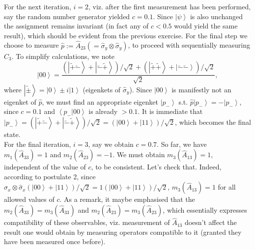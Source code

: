 \documentclass[british,aps,prl,superscriptaddress,nofootinbib,times,reprint]{revtex4-1}
\theoremstyle{plain}
\theoremstyle{definition}
\theoremstyle{remark}
\theoremstyle{remark}
\theoremstyle{remark}
\theoremstyle{plain}
\theoremstyle{plain}
\theoremstyle{plain}
\theoremstyle{definition}
\theoremstyle{definition}
\begin{document}
For the next iteration, $i=2$, viz.
after the first measurement has been performed,
say the random number generator yielded $c=0.1$.
Since $\left|\psi\right\rangle $ is also unchanged
the assignment remains invariant (in fact any of
$c<0.5$ would yield the same result), which should
be evident from the previous exercise. For the
final step we choose to measure
$\hat p := \hat{A}_{23}(=\hat{\sigma}_{y}\otimes\hat{\sigma}_{y})$,
to proceed with sequentially measuring
$\hat{C}_{3}$. To simplify calculations, we note
\[ \left|00\right\rangle
=\frac{(\left|\tilde{+}\tilde{-}\right\rangle
+\left|\tilde{-}\tilde{+}\right\rangle
)/\sqrt{2}+(\left|\tilde{+}\tilde{+}\right\rangle
+\left|\tilde{-}\tilde{-}\right\rangle
)/\sqrt{2}}{\sqrt{2}}, \] where
$\left|\tilde{\pm}\right\rangle
=\left|0\right\rangle \pm i\left|1\right\rangle $
(eigenkets of $\hat{\sigma}_{y}$). Since
$\left|00\right\rangle $ is manifestly not an
eigenket of $\hat{p}$, we must find an appropriate
eigenket $\left|p_{-}\right\rangle $ s.t.
$\hat{p}\left|p_{-}\right\rangle
=-\left|p_{-}\right\rangle $, since $c=0.1$ and
$\left\langle p_{-}|00\right\rangle $ is already
$>0.1$. It is immediate that
$\left|p_{-}\right\rangle
=\left(\left|\tilde{+}\tilde{-}\right\rangle
+\left|\tilde{-}\tilde{+}\right\rangle
\right)/\sqrt{2}=\left(\left|00\right\rangle
+\left|11\right\rangle \right)/\sqrt{2}$, which
becomes the final state. \\ For the final
iteration, $i=3$, say we obtain $c=0.7$. So far,
we have $m_{1}(\hat{A}_{33})=1$ and
$m_{2}(\hat{A}_{23})=-1$. We must obtain
$m_{3}(\hat{A}_{13})=1$, independent of the value
of $c$, to be consistent. Let's check that.
Indeed, according to postulate 2, since
$\hat{\sigma}_{x}\otimes\hat{\sigma}_{x}\left(\left|00\right\rangle
+\left|11\right\rangle
\right)/\sqrt{2}=1\left(\left|00\right\rangle
+\left|11\right\rangle \right)/\sqrt{2}$,
$m_{3}(\hat{A}_{13})=1$ for all allowed values of
$c$. As a remark, it maybe emphasised that the
$m_{2}(\hat{A}_{33})=m_{3}(\hat{A}_{33})$ and
$m_{2}(\hat{A}_{23})=m_{3}(\hat{A}_{23})$, which
essentially expresses compatibility of these
observables, viz. measurement of $\hat{A}_{13}$
doesn't affect the result one would obtain by
measuring operators compatible to it (granted they
have been measured once before).
\end{document}
